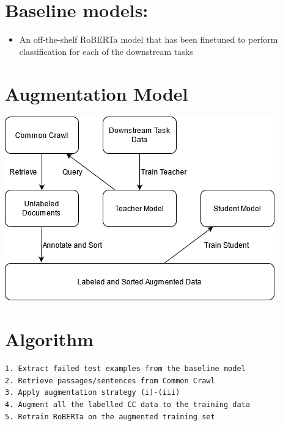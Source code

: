 \documentclass[twocolumn]{article}
\begin{document}
\section{Baseline models:}
\label{sec:org3f01150}
\begin{itemize}
\item An off-the-shelf RoBERTa model that has been finetuned to perform classification for each of the downstream tasks
\end{itemize}

\section{Augmentation Model}
\label{sec:orgee4db84}
\begin{center}
\includegraphics[width=.9\linewidth]{./png/da.png}
\end{center}


\section{Algorithm}
\label{sec:orgb9d0136}
\begin{verbatim}
1. Extract failed test examples from the baseline model
2. Retrieve passages/sentences from Common Crawl 
3. Apply augmentation strategy (i)-(iii)
4. Augment all the labelled CC data to the training data
5. Retrain RoBERTa on the augmented training set 
\end{verbatim}
\end{document}
